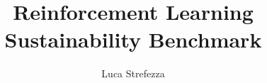 \documentclass[12pt,a4paper,oneside,titlepage]{scrartcl}
\begin{document}
	\author{Luca Strefezza}
	\title{Reinforcement Learning Sustainability Benchmark}
	\maketitle
	
	{
		\hypersetup{linkcolor=black}
		\tableofcontents
	}
	
	
	
	
	
	\printbibliography[heading=bibintoc]
	
\end{document}
